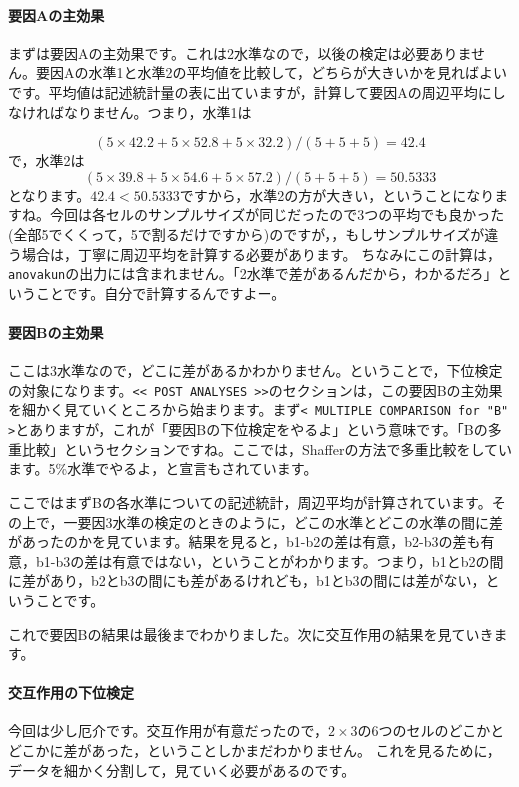 \documentclass{ltjbook}
\begin{document}
\paragraph{要因Aの主効果}まずは要因Aの主効果です。これは2水準なので，以後の検定は必要ありません。要因Aの水準1と水準2の平均値を比較して，どちらが大きいかを見ればよいです。平均値は記述統計量の表に出ていますが，計算して要因Aの周辺平均にしなければなりません。つまり，水準1は

\[ (5 \times 42.2 + 5 \times 52.8 + 5 \times 32.2) / (5 + 5 + 5) = 42.4 \]
で，水準2は
\[ (5 \times 39.8 + 5 \times 54.6 + 5 \times 57.2) / (5 + 5 + 5) = 50.5333 \]
となります。$42.4 < 50.5333$ですから，水準2の方が大きい，ということになりますね。今回は各セルのサンプルサイズが同じだったので3つの平均でも良かった(全部5でくくって，5で割るだけですから)のですが，，もしサンプルサイズが違う場合は，丁寧に周辺平均を計算する必要があります。
ちなみにこの計算は，\verb|anovakun|の出力には含まれません。「2水準で差があるんだから，わかるだろ」ということです。自分で計算するんですよー。

\paragraph{要因Bの主効果}ここは3水準なので，どこに差があるかわかりません。ということで，下位検定の対象になります。\verb|<< POST ANALYSES >>|のセクションは，この要因Bの主効果を細かく見ていくところから始まります。まず\verb|< MULTIPLE COMPARISON for "B" >|とありますが，これが「要因Bの下位検定をやるよ」という意味です。「Bの多重比較」というセクションですね。ここでは，Shafferの方法で多重比較をしています。5\%水準でやるよ，と宣言もされています。

ここではまずBの各水準についての記述統計，周辺平均が計算されています。その上で，一要因3水準の検定のときのように，どこの水準とどこの水準の間に差があったのかを見ています。結果を見ると，b1-b2の差は有意，b2-b3の差も有意，b1-b3の差は有意ではない，ということがわかります。つまり，b1とb2の間に差があり，b2とb3の間にも差があるけれども，b1とb3の間には差がない，ということです。

これで要因Bの結果は最後までわかりました。次に交互作用の結果を見ていきます。

\paragraph{交互作用の下位検定}
今回は少し厄介です。交互作用が有意だったので，$2 \times 3$の6つのセルのどこかとどこかに差があった，ということしかまだわかりません。
これを見るために，データを細かく分割して，見ていく必要があるのです。
\end{document}

